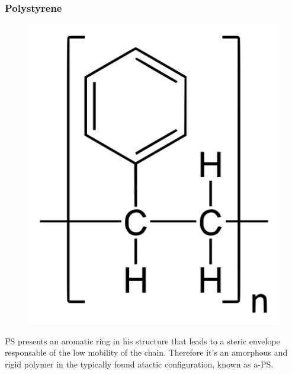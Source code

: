 \documentclass[a4paper, 11pt]{article}
\begin{document}
\newpage

\subsubsection{Polystyrene}

\begin{figure}[htp]
	\centering
	{\includegraphics[scale=0.16]{ps_chem}}
	\captionsetup{justification=centering}
	\label{fig:PE}
\end{figure}
PS presents an aromatic ring in his structure that leads to a steric envelope responsable of the low mobility of the chain. Therefore it's an amorphous and rigid polymer in the typically found atactic configuration, known as a-PS.
\end{document}
